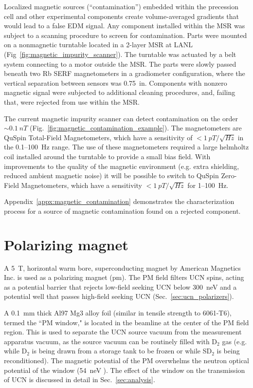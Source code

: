 Localized magnetic sources (``contamination'') embedded within the precession cell and other experimental components create volume-averaged gradients that would lead to a false EDM signal. Any component installed within the MSR was subject to a scanning procedure to screen for contamination. Parts were mounted on a nonmagnetic turntable located in a 2-layer MSR at LANL (Fig~\ref{fig:magnetic_impurity_scanner}). The turntable was actuated by a belt system connecting to a motor outside the MSR. The parts were slowly passed beneath two Rb SERF magnetometers in a gradiometer configuration, where the vertical separation between sensors was \qty{0.75}{in}. Components with nonzero magnetic signal were subjected to additional cleaning procedures, and, failing that, were rejected from use within the MSR.

The current magnetic impurity scanner can detect contamination on the order $\sim\qty{0.1}{nT}$ (Fig.~\ref{fig:magnetic_contamination_example}). The magnetometers are QuSpin Total-Field Magnetometers, which have a sensitivity of $<\qty{1}{pT\per\sqrt{Hz}}$ in the 0.1--\qty{100}{\hertz} range. The use of these magnetometers required a large helmholtz coil installed around the turntable to provide a small bias field. With improvements to the quality of the magnetic environment (e.g. extra shielding, reduced ambient magnetic noise) it will be possible to switch to QuSpin Zero-Field Magnetometers, which have a sensitivity $<\qty{1}{pT\per\sqrt{Hz}}$ for 1--\qty{100}{\hertz}.

Appendix~\ref{appx:magnetic_contamination} demonstrates the characterization process for a source of magnetic contamination found on a rejected component.


\section{Polarizing magnet}\label{sec:PM_description}


A \qty{5}{\tesla}, horizontal warm bore, superconducting magnet by American Magnetics Inc. is used as a polarizing magnet (\acrshort*{pm}). The PM field filters UCN spins, acting as a potential barrier that rejects low-field seeking UCN below \qty{300}{\nano\eV} and a potential well that passes high-field seeking UCN (Sec.~\ref{sec:ucn_polarizers}). 

A \qty{0.1}{\milli\meter} thick Al97 Mg3 alloy foil (similar in tensile strength to 6061-T6), termed the ``PM window," is located in the beamline at the center of the PM field region. This is used to separate the UCN source vacuum from the measurement apparatus vacuum, as the source vacuum can be routinely filled with D$_2$ gas (e.g. while D$_2$ is being drawn from a storage tank to be frozen or while SD$_2$ is being reconditioned). The magnetic potential of the PM overwhelms the neutron optical potential of the window (\qty{54}{\nano\eV} \cite{golubUCN}). The effect of the window on the transmission of UCN is discussed in detail in Sec.~\ref{sec:analysis}.

